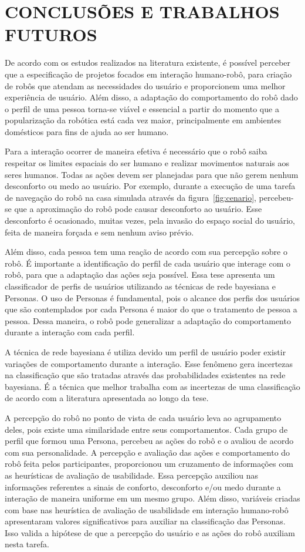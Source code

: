 \chapter{CONCLUSÕES E TRABALHOS FUTUROS}
\label{cap:conclusoes}
De acordo com os estudos realizados na literatura existente, é possível perceber que a especificação de projetos focados em interação humano-robô, para criação de robôs que atendam as necessidades do usuário e proporcionem uma melhor experiência de usuário. Além disso, a adaptação do comportamento do robô dado o perfil de uma pessoa torna-se viável e essencial a partir do momento que a popularização da robótica está cada vez maior, principalmente em ambientes domésticos para fins de ajuda ao ser humano.

Para a interação ocorrer de maneira efetiva é necessário que o robô saiba respeitar os limites espaciais do ser humano e realizar movimentos naturais aos seres humanos. Todas as ações devem ser planejadas para que não gerem nenhum desconforto ou medo ao usuário. Por exemplo, durante a execução de uma tarefa de navegação do robô na casa simulada através da figura~\ref{fig:cenario}, percebeu-se que a aproximação do robô pode causar desconforto ao usuário. Esse desconforto é ocasionado, muitas vezes, pela invasão do espaço social do usuário, feita de maneira forçada e sem nenhum aviso prévio.

Além disso, cada pessoa tem uma reação de acordo com sua percepção sobre o robô. É importante a identificação do perfil de cada usuário que interage com o robô, para que a adaptação das ações seja possível. Essa tese apresenta um classificador de perfis de usuários utilizando as técnicas de rede bayesiana e Personas. O uso de Personas é fundamental, pois o alcance dos perfis dos usuários que são contemplados por cada Persona é maior do que o tratamento de pessoa a pessoa. Dessa maneira, o robô pode generalizar a adaptação do comportamento durante a interação com cada perfil. 

A técnica de rede bayesiana é utiliza devido um perfil de usuário poder existir variações de comportamento durante a interação. Esse fenômeno gera incertezas na classificação que são tratadas através das probabilidades existentes na rede bayesiana. É a técnica que melhor trabalha com as incertezas de uma classificação de acordo com a literatura apresentada ao longo da tese.

A percepção do robô no ponto de vista de cada usuário leva ao agrupamento deles, pois existe uma similaridade entre seus comportamentos. Cada grupo de perfil que formou uma Persona, percebeu as ações do robô e o avaliou de acordo com sua personalidade. A percepção e avaliação das ações e comportamento do robô feita pelos participantes, proporcionou um cruzamento de informações com as heurísticas de avaliação de usabilidade. Essa percepção auxiliou nas informações referentes a sinais de conforto, desconforto e/ou medo durante a interação de maneira uniforme em um mesmo grupo. Além disso, variáveis criadas com base nas heurística de avaliação de usabilidade em interação humano-robô apresentaram valores significativos para auxiliar na classificação das Personas. Isso valida a hipótese de que a percepção do usuário e as ações do robô auxiliam nesta tarefa.

